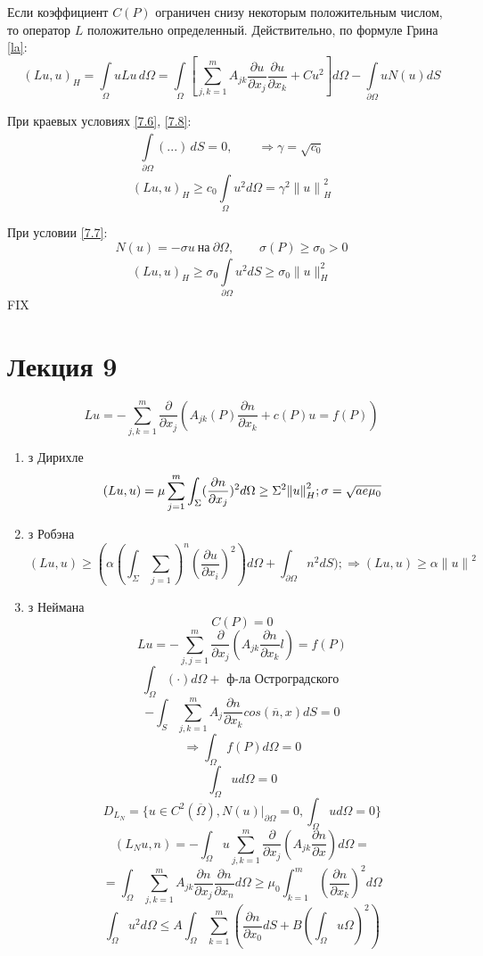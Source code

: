 \documentclass[12pt, a4paper]{article}
\newcommand{\Int}{\int\limits}
\newcommand{\Sum}{\sum\limits}
\begin{document}
Если коэффициент $C(P)$ ограничен снизу некоторым положительным числом, то оператор $L$ положительно определенный. Действительно, по формуле Грина \eqref{la}:
\[ {(Lu, u)}_H = \Int_{\Omega}^{}u Lu \, d\Omega = \Int_{\Omega}^{} \left[\Sum_{j,k=1}^{m} A_{jk} \frac{\partial u}{\partial  x_j}\frac{\partial u}{\partial x_k} + C u^2 \right] d\Omega - \Int_{\partial \Omega}^{} u N (u) dS \]

При краевых условиях \eqref{7.6}, \eqref{7.8}:
\[ \Int_{\partial \Omega}^{}(...) \, dS = 0, \qquad \Rightarrow \gamma = \sqrt{c_0} \]
\[ {(Lu,u)}_H \geq c_0 \Int_{\Omega}^{} u^2 d\Omega = \gamma^2 {\|u\|}^2_H \]

При условии \eqref{7.7}:
\[ N(u) = -\sigma u \ \text{на} \ \partial  \Omega, \qquad \sigma (P) \geq \sigma_0 > 0 \]
\[ (Lu, u)_H \geq \sigma_0 \Int_{ \partial  \Omega}^{} u^2 dS \geq \sigma_0 \|u\|^2_H \]
FIX

\newpage

\section{Лекция 9}

\[ Lu = - \sum_{j,k=1}^{m} \frac{\partial }{\partial  x_j} (A_{jk}(P)\frac{\partial n}{\partial x_k} + c(P)u = f(P)) \label{8_1_1}\]

\begin{enumerate}
	\item з Дирихле
	\[ (Lu, u) = \mu \sum_{j=1}^{m} \int_{\Sigma}^{}(\frac{\partial n}{\partial x_j})^2 d\Omega \geq \Sigma^2 {\|u\|}^2_H; \sigma = \sqrt{\\ae \mu_0}\]
	\item з Робэна $\label{8_3}$
	\[ (Lu, u) \geq (\alpha {(\int_{\Sigma}^{} \sum_{j=1})}^{n}(\frac{\partial u}{\partial x_i})^2) d\Omega + \int_{\partial \Omega}^{}n^2 dS) ; \Rightarrow (Lu, u) \geq \alpha {\|u\|}^2 \]
	\item з Неймана
	\[ C(P) = 0 \]
	\[ Lu = -\sum_{j,j =1}^{m}\frac{\partial}{\partial  x_j}(A_{jk} \frac{\partial n}{\partial x_k}l) = f(P) \]
	\[ \int_{\Omega}^{}(\cdot) d \Omega + \textrm{ ф-ла Остроградского } \]
	\[ -\int_{S}^{} \sum_{j,k = 1}^{m} A_j \frac{\partial n}{\partial x_k} cos( \overline{n}, x) dS = 0 \]
	\[ \Rightarrow \int_{\Omega}^{}f(P) d \Omega = 0 \]
	\[ \int_{\Omega}^{} u d\Omega = 0 \]
	\[ D_{L_N} = \{ u \in C^2 ( \overline{\Omega}), N(u)|_{\partial \Omega} = 0, \int_{\Omega}^{}u d \Omega = 0 \} \]
	\[ (L_N u, n) = -\int_{\Omega}^{} u \sum_{j,k=1}^{m} \frac{\partial }{\partial x_j}(A_{jk} \frac{\partial n}{\partial x}) d\Omega = \]
	\[ = \int_{\Omega}^{} \sum_{j,k=1}^{m} A_{jk} \frac{\partial n}{\partial x_j} \frac{\partial n}{\partial  x_n} d \Omega \geq \mu_0 \int_{k=1}^{m} (\frac{\partial n}{\partial x_k})^2 d\Omega \]
	\[ \int_{\Omega}^{} u^2 d\Omega \leq A \int_{\Omega}^{} \sum_{k = 1}^{m} (\frac{\partial  n}{\partial x_0}dS + B (\int_{\Omega}^{} u \Omega)^2)\]

\end{enumerate}
\end{document}
